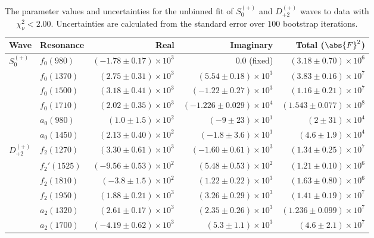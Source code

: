 \begin{table}[ht]
    \begin{center}
        \begin{tabular}{llrrr}\toprule
        Wave & Resonance & Real & Imaginary & Total ($\abs{F}^2$) \\\midrule
$S_{0}^{(+)}$ & $f_{0}(980)$ & $(-1.78 \pm 0.17) \times 10^{3}$ & $0.0$ (fixed) & $(3.18 \pm 0.70) \times 10^{6}$ \\
 & $f_{0}(1370)$ & $(2.75 \pm 0.31) \times 10^{3}$ & $(5.54 \pm 0.18) \times 10^{3}$ & $(3.83 \pm 0.16) \times 10^{7}$ \\
 & $f_{0}(1500)$ & $(3.18 \pm 0.41) \times 10^{3}$ & $(-1.22 \pm 0.27) \times 10^{3}$ & $(1.16 \pm 0.21) \times 10^{7}$ \\
 & $f_{0}(1710)$ & $(2.02 \pm 0.35) \times 10^{3}$ & $(-1.226 \pm 0.029) \times 10^{4}$ & $(1.543 \pm 0.077) \times 10^{8}$ \\
 & $a_{0}(980)$ & $(1.0 \pm 1.5) \times 10^{2}$ & $(-9 \pm 23) \times 10^{1}$ & $(2 \pm 31) \times 10^{4}$ \\
 & $a_{0}(1450)$ & $(2.13 \pm 0.40) \times 10^{2}$ & $(-1.8 \pm 3.6) \times 10^{1}$ & $(4.6 \pm 1.9) \times 10^{4}$ \\
$D_{+2}^{(+)}$ & $f_{2}(1270)$ & $(3.30 \pm 0.61) \times 10^{3}$ & $(-1.60 \pm 0.61) \times 10^{3}$ & $(1.34 \pm 0.25) \times 10^{7}$ \\
 & $f_{2}'(1525)$ & $(-9.56 \pm 0.53) \times 10^{2}$ & $(5.48 \pm 0.53) \times 10^{2}$ & $(1.21 \pm 0.10) \times 10^{6}$ \\
 & $f_{2}(1810)$ & $(-3.8 \pm 1.5) \times 10^{2}$ & $(1.22 \pm 0.22) \times 10^{3}$ & $(1.63 \pm 0.80) \times 10^{6}$ \\
 & $f_{2}(1950)$ & $(1.88 \pm 0.21) \times 10^{3}$ & $(3.26 \pm 0.29) \times 10^{3}$ & $(1.41 \pm 0.19) \times 10^{7}$ \\
 & $a_{2}(1320)$ & $(2.61 \pm 0.17) \times 10^{3}$ & $(2.35 \pm 0.26) \times 10^{3}$ & $(1.236 \pm 0.099) \times 10^{7}$ \\
 & $a_{2}(1700)$ & $(-4.19 \pm 0.62) \times 10^{3}$ & $(5.3 \pm 1.1) \times 10^{3}$ & $(4.6 \pm 2.1) \times 10^{7}$ \\\bottomrule
        \end{tabular}
    \caption{The parameter values and uncertainties for the unbinned fit of $S_{0}^{(+)}$ and $D_{+2}^{(+)}$ waves to data with $\chi^2_\nu < 2.00$. Uncertainties are calculated from the standard error over $100$ bootstrap iterations.}\label{tab:unbinned-fit-chisqdof-2.0-Sp0p-Dp2p}
    \end{center}
\end{table}
